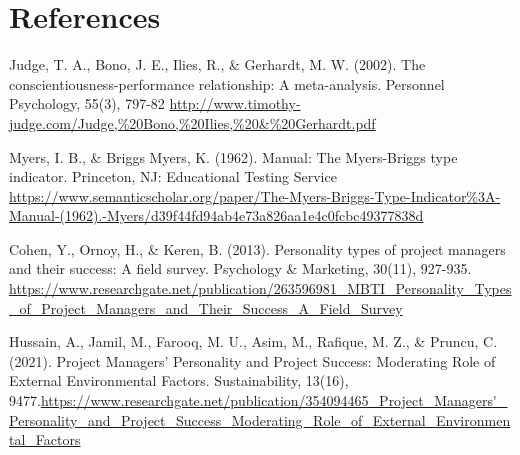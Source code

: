 \section{References}

    \begin{enumerate}[label={[\arabic*]}]
        \item Judge, T. A., Bono, J. E., Ilies, R., \& Gerhardt, M. W. (2002). The conscientiousness-performance relationship: A meta-analysis. Personnel Psychology, 55(3), 797-82 \url{http://www.timothy-judge.com/Judge,%20Bono,%20Ilies,%20&%20Gerhardt.pdf}

        \item Myers, I. B., \& Briggs Myers, K. (1962). Manual: The Myers-Briggs type indicator. Princeton, NJ: Educational Testing Service \url{https://www.semanticscholar.org/paper/The-Myers-Briggs-Type-Indicator%3A-Manual-(1962).-Myers/d39f44fd94ab4e73a826aa1e4c0fcbc49377838d}

        \item Cohen, Y., Ornoy, H., \& Keren, B. (2013). Personality types of project managers and their success: A field survey. Psychology \& Marketing, 30(11), 927-935. \url{https://www.researchgate.net/publication/263596981_MBTI_Personality_Types_of_Project_Managers_and_Their_Success_A_Field_Survey}

        \item Hussain, A., Jamil, M., Farooq, M. U., Asim, M., Rafique, M. Z., \& Pruncu, C. (2021). Project Managers’ Personality and Project Success: Moderating Role of External Environmental Factors. Sustainability, 13(16), 9477.\url{https://www.researchgate.net/publication/354094465_Project_Managers'_Personality_and_Project_Success_Moderating_Role_of_External_Environmental_Factors}
  
    \end{enumerate}